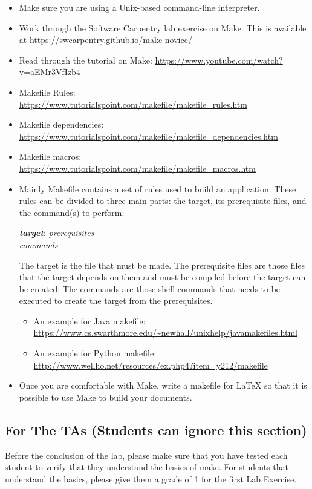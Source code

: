 \documentclass[12pt,fleqn]{article}
\newcommand{\bi}{\begin{itemize}}
\newcommand{\ei}{\end{itemize}}
\begin{document}
\bi
\item Make sure you are using a Unix-based command-line interpreter.
\item Work through the Software Carpentry lab exercise on Make. This is
  available at \url{https://swcarpentry.github.io/make-novice/}
\item Read through the tutorial on Make: \newline
\url{https://www.youtube.com/watch?v=aEMr3VfIzb4}
\item Makefile Rules:
\\
\url{https://www.tutorialspoint.com/makefile/makefile_rules.htm}
\item Makefile dependencies:
\\
\url{https://www.tutorialspoint.com/makefile/makefile_dependencies.htm}
\item Makefile macros:
\\
\url{https://www.tutorialspoint.com/makefile/makefile_macros.htm}
\item Mainly Makefile contains a set of rules used to build an
application. These rules can be divided to three main parts: the target,
its prerequisite files, and the command(s) to perform:
\begin{addmargin*}[4em]{2em}
\textbf{\textit{target}}: \textit{prerequisites}
\\
\hspace*{13 mm} \textit{commands}
\end{addmargin*}
The target is the file that must be made. The prerequisite files are those
files that the target depends on them and
must be compiled before the target can be created. The commands are those shell
commands that
 needs to be executed to create the target from the prerequisites.
\bi
\item An example for Java makefile:
\\
\url{https://www.cs.swarthmore.edu/~newhall/unixhelp/javamakefiles.html}
\item An example for Python makefile:
\\
\url{http://www.wellho.net/resources/ex.php4?item=y212/makefile}
\ei
\item Once you are comfortable with Make, write a makefile for LaTeX so that it 
is possible to use Make to build your documents. 
\ei

\subsection*{For The TAs (Students can ignore this section)}
Before the conclusion of the lab, please make sure that you have tested each
student to verify that they understand the basics of make.  For students that
understand the basics, please give them a grade of 1 for the first Lab Exercise.
\end{document}

